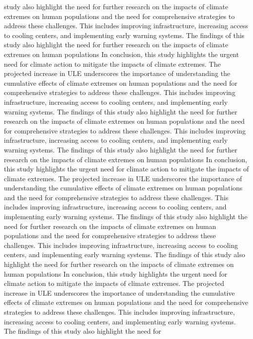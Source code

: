 \documentclass[9pt, twoside]{extarticle}
\begin{document}
\begin{maintext}
study also highlight the need for further research on the impacts of climate extremes on human populations and the need for comprehensive strategies to address these challenges. This includes improving infrastructure, increasing access to cooling centers, and implementing early warning systems.\cite{IPCC2021} The findings of this study also highlight the need for further research on the impacts of climate extremes on human populations  In conclusion, this study highlights the urgent need for climate action to mitigate the impacts of climate extremes. The projected increase in ULE underscores the importance of understanding the cumulative effects of climate extremes on human populations and the need for comprehensive strategies to address these challenges. This includes improving infrastructure, increasing access to cooling centers, and implementing early warning systems.\cite{IPCC2021} The findings of this study also highlight the need for further research on the impacts of climate extremes on human populations and the need for comprehensive strategies to address these challenges. This includes improving infrastructure, increasing access to cooling centers, and implementing early warning systems.\cite{IPCC2021} The findings of this study also highlight the need for further research on the impacts of climate extremes on human populations  In conclusion, this study highlights the urgent need for climate action to mitigate the impacts of climate extremes. The projected increase in ULE underscores the importance of understanding the cumulative effects of climate extremes on human populations and the need for comprehensive strategies to address these challenges. This includes improving infrastructure, increasing access to cooling centers, and implementing early warning systems.\cite{IPCC2021} The findings of this study also highlight the need for further research on the impacts of climate extremes on human populations and the need for comprehensive strategies to address these challenges. This includes improving infrastructure, increasing access to cooling centers, and implementing early warning systems.\cite{IPCC2021} The findings of this study also highlight the need for further research on the impacts of climate extremes on human populations  In conclusion, this study highlights the urgent need for climate action to mitigate the impacts of climate extremes. The projected increase in ULE underscores the importance of understanding the cumulative effects of climate extremes on human populations and the need for comprehensive strategies to address these challenges. This includes improving infrastructure, increasing access to cooling centers, and implementing early warning systems.\cite{IPCC2021} The findings of this study also highlight the need for


\end{maintext}
\end{document}
